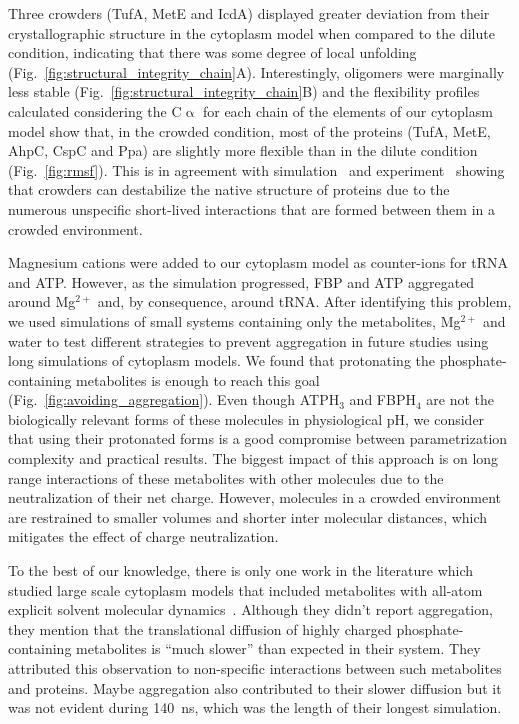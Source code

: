 \documentclass[journal=jacsat,manuscript=article]{achemso}
\begin{document}
Three crowders (TufA, MetE and IcdA) displayed greater deviation from their crystallographic structure in the cytoplasm model when compared to the dilute condition, indicating that there was some degree of local unfolding (Fig.~\ref{fig:structural_integrity_chain}A). Interestingly, oligomers were marginally less stable (Fig.~\ref{fig:structural_integrity_chain}B) and the flexibility profiles calculated considering the C$\upalpha$ for each chain of the elements of our cytoplasm model show that, in the crowded condition, most of the proteins (TufA, MetE, AhpC, CspC and Ppa) are slightly more flexible than in the dilute condition (Fig.~\ref{fig:rmsf}). This is in agreement with simulation~\cite{Feig2011} and experiment~\cite{miklos2011,Wang2012b} showing that crowders can destabilize the native structure of proteins due to the numerous unspecific short-lived interactions that are formed between them in a crowded environment.


Magnesium cations were added to our cytoplasm model as counter-ions for tRNA and ATP. However, as the simulation progressed, FBP and ATP aggregated around Mg$^{2+}$ and, by consequence, around tRNA. After identifying this problem, we used simulations of small systems containing only the metabolites, Mg$^{2+}$ and water to test different strategies to prevent aggregation in future studies using long simulations of cytoplasm models. We found that protonating the phosphate-containing metabolites is enough to reach this goal (Fig.~\ref{fig:avoiding_aggregation}). Even though ATPH$_3$ and FBPH$_4$ are not the biologically relevant forms of these molecules in physiological pH, we consider that using their protonated forms is a good compromise between parametrization complexity and practical results. The biggest impact of this approach is on long range interactions of these metabolites with other molecules due to the neutralization of their net charge. However, molecules in a crowded environment are restrained to smaller volumes and shorter inter molecular distances, which mitigates the effect of charge neutralization.


To the best of our knowledge, there is only one work in the literature which studied large scale cytoplasm models that included metabolites with all-atom explicit solvent molecular dynamics~\cite{Yu2016a}. Although they didn't report aggregation, they mention that the translational diffusion of highly charged phosphate-containing metabolites is ``much slower'' than expected in their system. They attributed this observation to non-specific interactions between such metabolites and proteins. Maybe aggregation also contributed to their slower diffusion but it was not evident during \SI{140}{\nano\second}, which was the length of their longest simulation.
\end{document}
